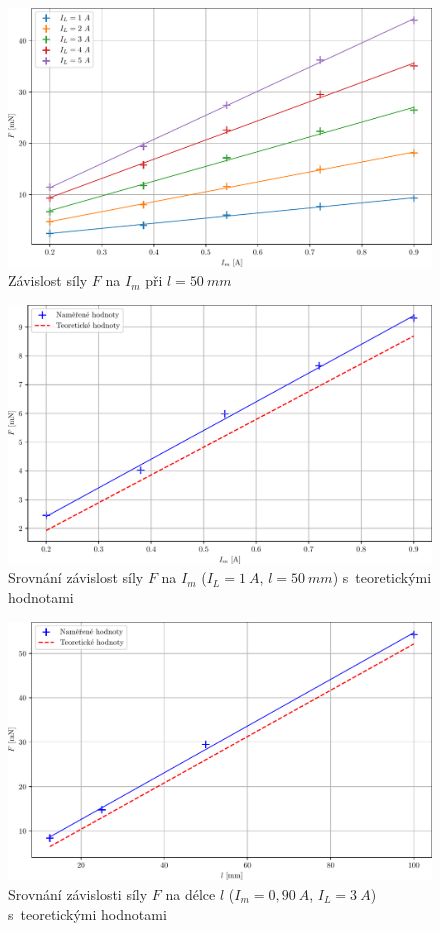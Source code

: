 \documentclass[a4paper,12pt]{article}
\begin{document}
\begin{figure}[H]
    \centering
    \includegraphics[width=1\textwidth]{img/F_vs_Im.pdf}
    \caption{Závislost síly $F$ na $I_m$ při $l=50\ mm$}
    \label{fig:F_vs_Im}
\end{figure}

\begin{figure}[H]
    \centering
    \includegraphics[width=1\textwidth]{img/F_vs_Im_theory_single.pdf}
    \caption{Srovnání závislost síly $F$ na $I_m$ ($I_L=1\ A$, $l=50\ mm$) s~teoretickými hodnotami}
    \label{fig:F_vs_Im_theory_single}
\end{figure}

\begin{figure}[H]
    \centering
    \includegraphics[width=1\textwidth]{img/F_vs_l_measured_theory.pdf}
    \caption{Srovnání závislosti síly $F$ na délce $l$ ($I_m=0,90\ A$, $I_L=3\ A$) s~teoretickými hodnotami}
    \label{fig:F_vs_l_measured_theory}
\end{figure}
\end{document}
